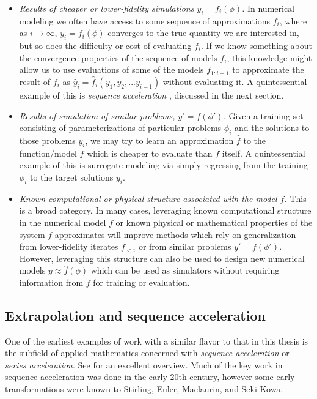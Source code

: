 \documentclass{puthesis}
\begin{document}
\begin{itemize}
  \item \emph{Results of cheaper or lower-fidelity simulations $y_i = f_i(\phi)$.}
  In numerical modeling we often have access to some sequence of approximations $f_i$,
  where as $i \to \infty$, $y_i = f_i(\phi)$ converges to the true quantity we are
  interested in, but so does the difficulty or cost of evaluating $f_i$.
  If we know something about the convergence properties of the sequence of models $f_i$,
  this knowledge might allow us to use evaluations of some of the
  models $f_{1:i-1}$ to approximate the result of $f_i$ as
  $\hat{y}_i = \hat{f}_i(y_1, y_2, ... y_{i-1})$ without evaluating it.
  A quintessential example of this is \emph{sequence acceleration}
  \citep{osada1991acceleration}, discussed in the
  next section. \\
  \item \emph{Results of simulation of similar problems, $y' = f(\phi')$.}
  Given a training set consisting of parameterizations of particular problems $\phi_i$
  and the solutions to those problems $y_i$, we may try to learn an approximation
  $\hat{f}$ to the function/model $f$ which is cheaper to evaluate than $f$ itself.
  A quintessential example of this is surrogate modeling via simply regressing from the
  training $\phi_i$ to the target solutions $y_i$.\\
  \item \emph{Known computational or physical structure associated with the
  model $f$.} This is a broad category.
  In many cases, leveraging known computational
  structure in the numerical model $f$ or known physical or mathematical properties of
  the system $f$ approximates will improve methods which rely on generalization from
  lower-fidelity iterates $f_{<i}$ or from similar problems $y' = f(\phi')$.
  However, leveraging this structure can also be used to design new numerical models
  $y \approx \hat{f}(\phi)$ which can be used as simulators without requiring information from
  $f$ for training or evaluation.
\end{itemize}

\subsection{Extrapolation and sequence acceleration}
One of the earliest examples of work with a similar flavor to that in this thesis
is the subfield of applied mathematics concerned with \emph{sequence acceleration} or
\emph{series acceleration}.
See \citet{osada1991acceleration} for an excellent overview.
Much of the key work in sequence acceleration was done in the early 20th century, however some early transformations were known to Stirling, Euler,
Maclaurin, and Seki Kowa.
\end{document}
